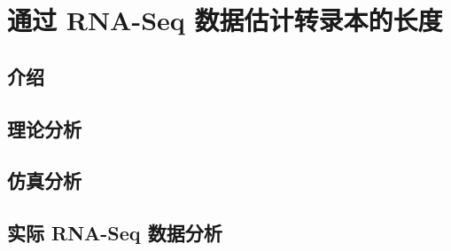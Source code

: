 \chapter{通过 RNA-Seq 数据估计转录本的长度}

\section{介绍}

\section{理论分析}

\section{仿真分析}

\section{实际 RNA-Seq 数据分析}


